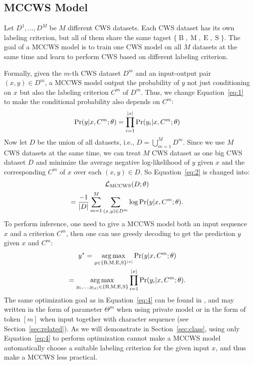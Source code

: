 \documentclass[11pt]{article}
\newcommand{\set}[1]{\lbrace #1 \rbrace}
\newcommand{\loss}{\mathcal{L}}
\newcommand{\BTag}{\operatorname{B}}
\newcommand{\MTag}{\operatorname{M}}
\newcommand{\ETag}{\operatorname{E}}
\newcommand{\STag}{\operatorname{S}}
\newcommand{\TagSet}{\set{\BTag, \MTag, \ETag, \STag}}
\newcommand{\opMCCWS}{\operatorname{MCCWS}}
\DeclareMathOperator*{\argmax}{\arg\max}
\DeclarePairedDelimiter{\abs}{\lvert}{\rvert}
\begin{document}
\subsection{MCCWS Model}\label{sec:mccws}

Let \(D^1, \dots, D^M\) be \(M\) different CWS datasets.
Each CWS dataset has its own labeling criterion, but all of them share the same tagset \(\TagSet\).
The goal of a MCCWS model is to train one CWS model on all \(M\) datasets at the same time and learn to perform CWS based on different labeling criterion.

Formally, given the \(m\)-th CWS dataset \(D^m\) and an input-output pair \((x, y) \in D^m\), a MCCWS model output the probability of \(y\) not just conditioning on \(x\) but also the labeling criterion \(C^m\) of \(D^m\).
Thus, we change Equation~\eqref{eq:1} to make the conditional probability also depends on \(C^m\):
\begin{equation}\label{eq:3}
  \Pr(y | x, C^m ; \theta) = \prod_{i = 1}^{\abs{x}} \Pr(y_i | x, C^m ; \theta)
\end{equation}
Now let \(D\) be the union of all datasets, i.e., \(D = \bigcup_{m = 1}^M D^m\).
Since we use \(M\) CWS datasets at the same time, we can treat \(M\) CWS dataset as one big CWS dataset \(D\) and minimize the average negative log-likelihood of \(y\) given \(x\) and the corresponding \(C^m\) of \(x\) over each \((x, y) \in D\).
So Equation~\eqref{eq:2} is changed into:
\begin{multline}\label{eq:4}
  \loss_{\opMCCWS}(D ; \theta) \\
  = \dfrac{-1}{\abs{D}} \sum_{m = 1}^M \sum_{(x, y) \in D^m} \log \Pr(y|x, C^m ; \theta).
\end{multline}
To perform inference, one need to give a MCCWS model both an input sequence \(x\) and a criterion \(C^m\), then one can use greedy decoding to get the prediction \(y\) given \(x\) and \(C^m\):
\begin{multline}\label{eq:5}
  y^* = \argmax_{y \in \TagSet^{\abs{x}}} \Pr(y | x, C^m ; \theta) \\
  = \argmax_{y_1, \dots, y_{\abs{x}} \in \TagSet} \prod_{i = 1}^{\abs{x}} \Pr(y_i | x, C^m ; \theta).
\end{multline}
The same optimization goal as in Equation~\eqref{eq:4} can be found in \citep{chen-etal-2017-adversarial,He-2019-effective,Gong-2019-switch,huang-etal-2020-towards,huang-etal-2020-joint-multiple,ke2020unified,qiu-etal-2020-concise,ke-etal-2021-pre}, and may written in the form of parameter \(\Theta^m\) when using private model or in the form of token \([m]\) when input together with character sequence (see Section~\ref{sec:related}).
As we will demonstrate in Section~\ref{sec:class}, using only Equation~\eqref{eq:4} to perform optimization cannot make a MCCWS model automatically choose a suitable labeling criterion for the given input \(x\), and thus make a MCCWS less practical.
\end{document}
